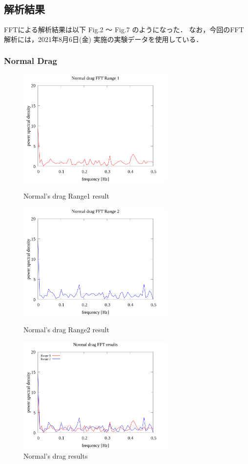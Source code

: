 \documentclass[twocolumn,a4j]{jsarticle}
\begin{document}
\subsection{解析結果}
FFTによる解析結果は以下 Fig.2 ～ Fig.7 のようになった．
なお，今回のFFT解析には，2021年8月6日(金) 実施の実験データを使用している．
\subsubsection{Normal Drag}
\begin{figure}[htbp]
    \footnotesize
    \begin{center}
        \includegraphics[width=78mm]{../images/Normal_drag_06.png}
        \caption{Normal's drag Range1 result}
        \includegraphics[width=78mm]{../images/Normal_drag_07.png}
        \caption{Normal's drag Range2 result}
        \includegraphics[width=78mm]{../images/Normal_drag_08.png}
        \caption{Normal's drag results}
    \end{center}
\end{figure}
\newpage
\end{document}
